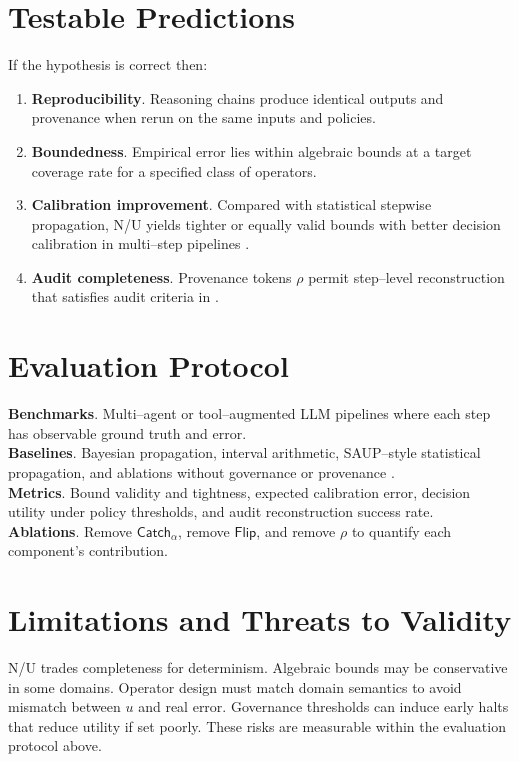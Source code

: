 \documentclass[11pt]{article}
\begin{document}
\section{Testable Predictions}
If the hypothesis is correct then:
\begin{enumerate}[itemsep=2pt,topsep=2pt]
\item \textbf{Reproducibility}. Reasoning chains produce identical outputs and provenance when rerun on the same inputs and policies.
\item \textbf{Boundedness}. Empirical error lies within algebraic bounds at a target coverage rate for a specified class of operators.
\item \textbf{Calibration improvement}. Compared with statistical stepwise propagation, N/U yields tighter or equally valid bounds with better decision calibration in multi--step pipelines \cite{Zhao2025}.
\item \textbf{Audit completeness}. Provenance tokens $\rho$ permit step--level reconstruction that satisfies audit criteria in \cite{IIA2024,IBM2025}.
\end{enumerate}

\section{Evaluation Protocol}
\textbf{Benchmarks}. Multi--agent or tool--augmented LLM pipelines where each step has observable ground truth and error.\\
\textbf{Baselines}. Bayesian propagation, interval arithmetic, SAUP--style statistical propagation, and ablations without governance or provenance \cite{Zhao2025}.\\
\textbf{Metrics}. Bound validity and tightness, expected calibration error, decision utility under policy thresholds, and audit reconstruction success rate.\\
\textbf{Ablations}. Remove $\mathsf{Catch}_\alpha$, remove $\mathsf{Flip}$, and remove $\rho$ to quantify each component's contribution.

\section{Limitations and Threats to Validity}
N/U trades completeness for determinism. Algebraic bounds may be conservative in some domains. Operator design must match domain semantics to avoid mismatch between $u$ and real error. Governance thresholds can induce early halts that reduce utility if set poorly. These risks are measurable within the evaluation protocol above.
\end{document}
